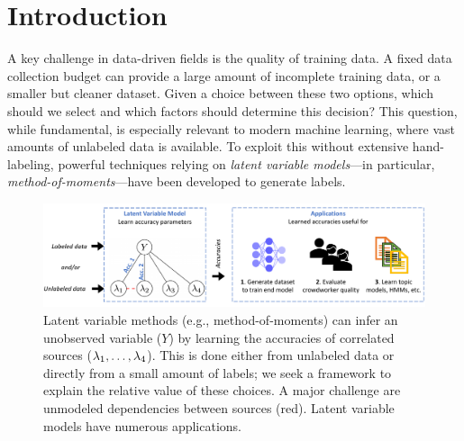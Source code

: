  \section{Introduction}
\vspace{-.5em}
A key challenge in data-driven fields is the quality of training data. A fixed data collection budget can
provide a large amount of incomplete training data, or a smaller but cleaner dataset. Given a choice between these two options, which should we select and which factors should determine this decision? This question, while fundamental, is especially
relevant to modern machine learning, where vast amounts of unlabeled data is available. To exploit this without extensive hand-labeling, powerful techniques relying on \emph{latent variable models}---in particular, \emph{method-of-moments}---have been developed to generate labels.


\begin{figure}
    \centering
    \includegraphics[width=.75\textwidth]{figures/maindiagram.pdf}
    \caption{Latent variable methods (e.g., method-of-moments) can infer an unobserved variable ($Y$) by learning the accuracies of correlated sources ($\lambda_1, \ldots, \lambda_4$). This is done either from unlabeled data or directly from a small amount of labels; we seek a framework to explain the relative value of these choices. A major challenge are unmodeled dependencies between sources (red). Latent variable models have numerous applications.}
    \label{fig:systemdiagram}
\end{figure}

